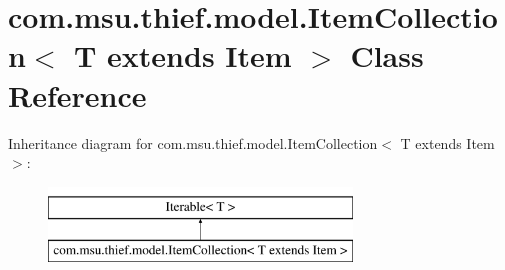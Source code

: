 \hypertarget{classcom_1_1msu_1_1thief_1_1model_1_1ItemCollection_3_01T_01extends_01Item_01_4}{\section{com.\-msu.\-thief.\-model.\-Item\-Collection$<$ T extends Item $>$ Class Reference}
\label{classcom_1_1msu_1_1thief_1_1model_1_1ItemCollection_3_01T_01extends_01Item_01_4}
}
Inheritance diagram for com.\-msu.\-thief.\-model.\-Item\-Collection$<$ T extends Item $>$\-:\begin{figure}[H]
\begin{center}
\leavevmode
\includegraphics[height=2.000000cm]{classcom_1_1msu_1_1thief_1_1model_1_1ItemCollection_3_01T_01extends_01Item_01_4}
\end{center}
\end{figure}
